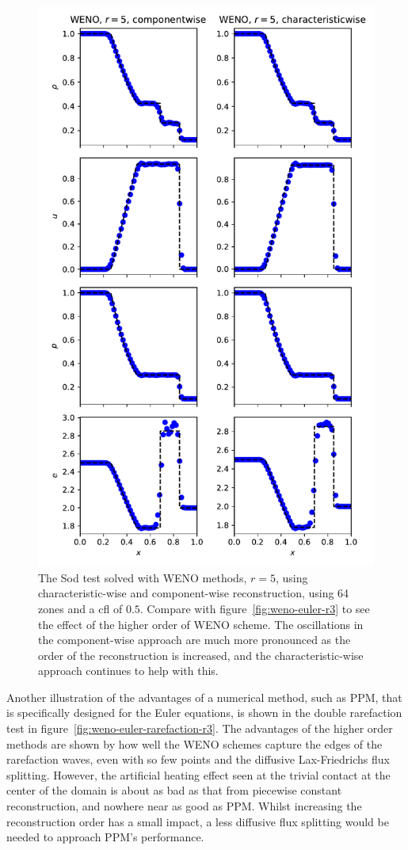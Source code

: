 \begin{figure}[t]
\centering
\includegraphics[width=0.8\linewidth]{weno-euler-r5}
\caption[WENO $r=5$ for the Sod test]
{\label{fig:weno-euler-r5} The Sod test solved with WENO methods, $r=5$, using characteristic-wise and component-wise reconstruction, using 64 zones and a cfl of $0.5$. Compare with figure~\ref{fig:weno-euler-r3} to see the effect of the higher order of WENO scheme. The oscillations in the component-wise approach are much more pronounced as the order of the reconstruction is increased, and the characteristic-wise approach continues to help with this. \\
}
\end{figure}
%

Another illustration of the advantages of a numerical method, such as PPM, that
is specifically designed for the Euler equations, is shown in the double
rarefaction test in figure~\ref{fig:weno-euler-rarefaction-r3}. The
advantages of the higher order methods are shown by how well the WENO schemes
capture the edges of the rarefaction waves, even with so few points and the
diffusive Lax-Friedrichs flux splitting. However, the artificial heating effect
seen at the trivial contact at the center of the domain is about as bad as that
from piecewise constant reconstruction, and nowhere near as good as PPM. Whilst
increasing the reconstruction order has a small impact, a less diffusive flux
splitting would be needed to approach PPM's performance.

